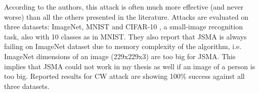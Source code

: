  According to the authors, this attack is often much more effective (and never worse) than all the others presented in the literature. 
Attacks are evaluated on three datasets: ImageNet, MNIST and CIFAR-10 \cite{datasetCIFAR10}, a small-image recognition task, also with 10 classes as in MNIST. They also report that JSMA is always failing on ImageNet dataset due to memory complexity of the algorithm, i.e. ImageNet dimensions of an image (229x229x3) are too big for JSMA. This implies that JSMA could not work in my thesis as well if an image of a person is too big. Reported results for CW attack are showing 100\% success against all three datasets.
